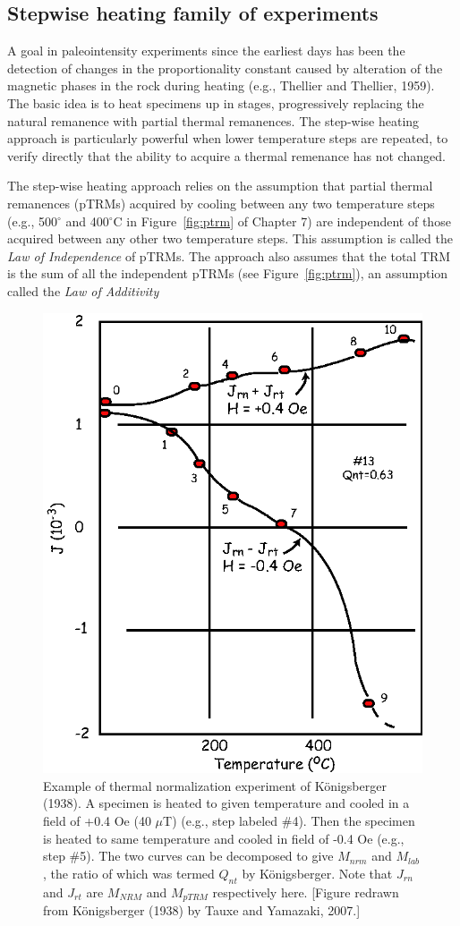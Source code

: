 \subsection{Stepwise heating  family of  experiments}
\label{sect:KTT}

A goal in paleointensity experiments since the earliest days has been the detection of changes in the proportionality constant caused by alteration of the magnetic phases in the rock during heating (e.g., Thellier and Thellier, 1959). \nocite{thellier59}   
The basic idea is to heat specimens up in stages, progressively replacing the natural remanence with  partial thermal remanences.    The step-wise heating
  approach is particularly powerful when lower temperature    steps are repeated, to verify directly  that the ability to acquire a  thermal remenance has not changed.   
  
   The step-wise heating approach relies on the assumption that partial thermal remanences (pTRMs) acquired by cooling between any two temperature steps (e.g., 500$^{\circ}$ and 400$^{\circ}$C in Figure~\ref{fig:ptrm}  of Chapter 7) are independent of those acquired between any other two temperature steps.  This assumption is called the 
{\it Law of Independence} of  pTRMs.  The approach also assumes that the total TRM is the sum of all the independent pTRMs (see Figure~\ref{fig:ptrm}), an assumption called the 
{\it Law of  Additivity}  
   
\begin{figure}[h!tb]
\centering  \includegraphics[width= 7 cm]{EPSfiles/koenigsberger.eps}
\caption{Example of thermal normalization experiment of K\"onigsberger (1938).  A specimen is heated to given temperature and cooled in a field of +0.4 Oe (40 $\mu$T) (e.g., step labeled \#4).  Then the specimen is heated to same temperature and cooled in field of -0.4 Oe (e.g., step \#5).  The two curves can be decomposed to give $M_{nrm}$ and $M_{lab}$, the ratio of which was termed $Q_{nt}$ by K\"onigsberger.  Note that $J_{rn}$ and $J_{rt}$ are $M_{NRM}$ and $M_{pTRM}$ respectively here. [Figure redrawn from K\"onigsberger (1938) by Tauxe and Yamazaki, 2007.]}
\label{fig:koenigsberger}
\end{figure} \nocite{koenigsberger38}
  

